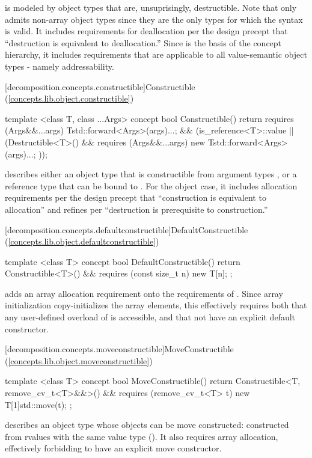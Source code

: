  is modeled by object types that are, unsuprisingly, destructible.  Note
that  only admits non-array object types since they are the only types for which
the syntax  is valid. It includes requirements for deallocation per the design
precept that ``destruction is equivalent to deallocation.'' Since  is the basis
of the concept hierarchy, it includes requirements that are applicable to all value-semantic
object types - namely addressability.

[decomposition.concepts.constructible]{Constructible (\ref{concepts.lib.object.constructible})}
\begin{codeblock}
template <class T, class ...Args>
concept bool Constructible() {
  return requires (Args&&...args) {
    T{std::forward<Args>(args)...};
  } &&
  (is_reference<T>::value ||
    (Destructible<T>() && requires (Args&&...args) {
      new T{std::forward<Args>(args)...};
    }));
}
\end{codeblock}

 describes either an object type  that is constructible from argument types
, or a reference type  that can be bound to . For the object case,
it includes allocation requirements per the design precept that ``construction is equivalent to allocation''
and refines  per ``destruction is prerequisite to construction.''

[decomposition.concepts.defaultconstructible]{DefaultConstructible (\ref{concepts.lib.object.defaultconstructible})}
\begin{codeblock}
template <class T>
concept bool DefaultConstructible() {
  return Constructible<T>() &&
    requires (const size_t n) {
      new T[n]{};
    };
}
\end{codeblock}

 adds an array allocation requirement onto the requirements of
. Since array initialization copy-initializes the array elements,
this effectively requires both that any user-defined overload of  is
accessible, and that  not have an explicit default constructor.

[decomposition.concepts.moveconstructible]{MoveConstructible (\ref{concepts.lib.object.moveconstructible})}
\begin{codeblock}
template <class T>
concept bool MoveConstructible() {
  return Constructible<T, remove_cv_t<T>&&>() &&
    requires (remove_cv_t<T> t) {
      new T[1]{std::move(t)};
    };
}
\end{codeblock}
 describes an object type  whose objects can be move constructed:
constructed from rvalues with the same value type (). It also requires array
allocation, effectively forbidding  to have an explicit move constructor.

